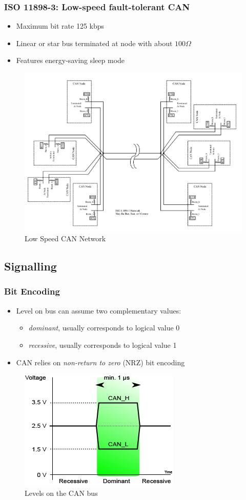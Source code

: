 \documentclass{beamer}
\begin{document}
\begin{frame}
	\frametitle{ISO 11898-3: Low-speed fault-tolerant CAN}
	\begin{itemize}
		\item Maximum bit rate 125 kbps
		\item Linear or star bus terminated at node with about $100 \Omega$
		\item Features energy-saving sleep mode
	\end{itemize}
	\begin{figure}
\includegraphics[width=.4\textwidth]{lowspeed.png} 
\caption{Low Speed CAN Network \cite{iso118983}}
\end{figure}
\end{frame}

\subsection{Signalling}
\begin{frame}
	\frametitle{Bit Encoding}
	\begin{itemize}
		\item Level on bus can assume two complementary values:
		\begin{itemize}
			\item \textit{dominant}, usually corresponds to logical value 0
			\item \textit{recessive}, usually corresponds to logical value 1
		\end{itemize}
		\item CAN relies on \emph{non-return to zero} (NRZ) bit encoding
	\end{itemize}
	\begin{figure}
	\includegraphics[width=.4\textwidth]{Canbus_levels.png} 
\caption{Levels on the CAN bus \cite{canlevels}}
\end{figure}
\end{frame}
\end{document}
